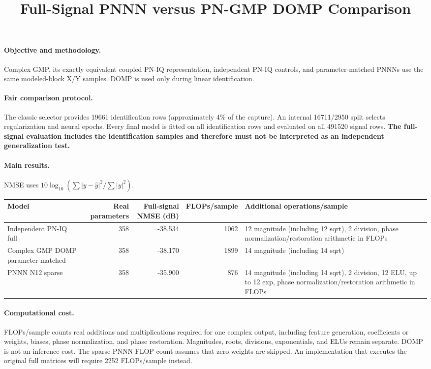 \documentclass[10pt]{article}
\title{Full-Signal PNNN versus PN-GMP DOMP Comparison}
\author{}\date{}
\begin{document}
\maketitle
\paragraph{Objective and methodology.} Complex GMP, its exactly equivalent coupled PN-IQ representation, independent PN-IQ controls, and parameter-matched PNNNs use the same modeled-block X/Y samples. DOMP is used only during linear identification.
\paragraph{Fair comparison protocol.} The classic selector provides 19661 identification rows (approximately 4\% of the capture). An internal 16711/2950 split selects regularization and neural epochs. Every final model is fitted on all identification rows and evaluated on all 491520 signal rows. \textbf{The full-signal evaluation includes the identification samples and therefore must not be interpreted as an independent generalization test.}
\paragraph{Main results.} NMSE uses $10\log_{10}(\sum|y-\hat y|^2/\sum|y|^2)$.
\begin{center}\small\begin{tabularx}{\linewidth}{XrrrX}
\toprule
Model & Real parameters & Full-signal NMSE (dB) & FLOPs/sample & Additional operations/sample \\ \midrule
Independent PN-IQ full & 358 & -38.534 & 1062 & 12 magnitude (including 12 sqrt), 2 division, phase normalization/restoration arithmetic in FLOPs \\ 
Complex GMP DOMP parameter-matched & 358 & -38.170 & 1899 & 14 magnitude (including 14 sqrt) \\ 
PNNN N12 sparse & 358 & -35.900 & 876 & 14 magnitude (including 14 sqrt), 2 division, 12 ELU, up to 12 exp, phase normalization/restoration arithmetic in FLOPs \\ 
\bottomrule\end{tabularx}\end{center}
\paragraph{Computational cost.} FLOPs/sample counts real additions and multiplications required for one complex output, including feature generation, coefficients or weights, biases, phase normalization, and phase restoration. Magnitudes, roots, divisions, exponentials, and ELUs remain separate. DOMP is not an inference cost. The sparse-PNNN FLOP count assumes that zero weights are skipped. An implementation that executes the original full matrices will require 2252 FLOPs/sample instead.
\end{document}
